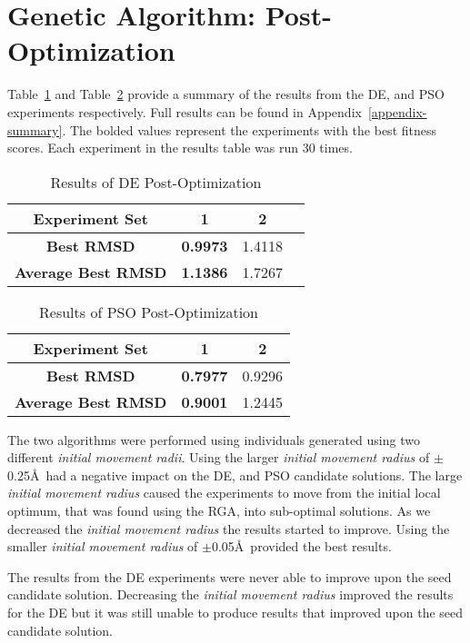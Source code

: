 \section{Genetic Algorithm: Post-Optimization}
\label{sec:post-op-analysis}

Table~\ref{table:post-op-de-results} and Table~\ref{table:post-op-pso-results} provide a summary of the results from the DE, and PSO experiments respectively. Full results can be found in Appendix~\ref{appendix-summary}. The bolded values represent the experiments with the best fitness scores. Each experiment in the results table was run 30 times. 

\begin{table}
	\centering
	\begin{tabular}{ | >{\bfseries}c | c | c | c | }
		\hline
		Experiment Set & 1 & 2 \\ \hline
		Best RMSD & \textbf{0.9973} & 1.4118 \\ \hline
		Average Best RMSD & \textbf{1.1386} & 1.7267 \\ \hline
	\end{tabular}
	\caption{Results of DE Post-Optimization}
	\label{table:post-op-de-results}
\end{table}

\begin{table}
	\centering
	\begin{tabular}{ | >{\bfseries}c | c | c | }
		\hline
		Experiment Set & 1 & 2 \\ \hline
		Best RMSD & \textbf{0.7977} & 0.9296 \\ \hline
		Average Best RMSD & \textbf{0.9001} & 1.2445 \\ \hline
	\end{tabular}
	\caption{Results of PSO Post-Optimization}
	\label{table:post-op-pso-results}
\end{table}

The two algorithms were performed using individuals generated using two different \textit{initial movement radii}. Using the larger \textit{initial movement radius} of $\pm$0.25\AA\ had a negative impact on the DE, and PSO candidate solutions. The large \textit{initial movement radius} caused the experiments to move from the initial local optimum, that was found using the RGA, into sub-optimal solutions. As we decreased the \textit{initial movement radius} the results started to improve. Using the smaller \textit{initial movement radius} of $\pm$0.05\AA\ provided the best results.

The results from the DE experiments were never able to improve upon the seed candidate solution. Decreasing the \textit{initial movement radius} improved the results for the DE but it was still unable to produce results that improved upon the seed candidate solution.

